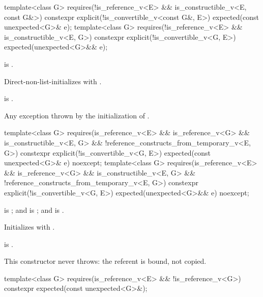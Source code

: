 %
\begin{itemdecl}
template<class G>
  requires(!is_reference_v<E> && is_constructible_v<E, const G&>)
constexpr explicit(!is_convertible_v<const G&, E>) expected(const unexpected<G>& e);
template<class G>
  requires(!is_reference_v<E> && is_constructible_v<E, G>)
constexpr explicit(!is_convertible_v<G, E>) expected(unexpected<G>&& e);
\end{itemdecl}

\begin{itemdescr}
\pnum
\constraints
{} is .

\pnum
\effects
Direct-non-list-initializes  with .

\pnum
\ensures
{} is .

\pnum
\throws
Any exception thrown by the initialization of .
\end{itemdescr}

%
\begin{itemdecl}
template<class G>
  requires(is_reference_v<E> && is_reference_v<G> && is_constructible_v<E, G> &&
           !reference_constructs_from_temporary_v<E, G>)
constexpr explicit(!is_convertible_v<G, E>) expected(const unexpected<G>& e) noexcept;
template<class G>
  requires(is_reference_v<E> && is_reference_v<G> && is_constructible_v<E, G> &&
           !reference_constructs_from_temporary_v<E, G>)
constexpr explicit(!is_convertible_v<G, E>) expected(unexpected<G>&& e) noexcept;
\end{itemdecl}

\begin{itemdescr}
\pnum
\constraints
{} is ; and  is ; and  is .

\pnum
\effects
Initializes  with .

\pnum
\ensures
{} is .

\pnum
\remarks
This constructor never throws: the referent is bound, not copied.
\end{itemdescr}

%
\begin{itemdecl}
template<class G>
  requires(is_reference_v<E> && !is_reference_v<G>)
constexpr expected(const unexpected<G>&);
\end{itemdecl}

